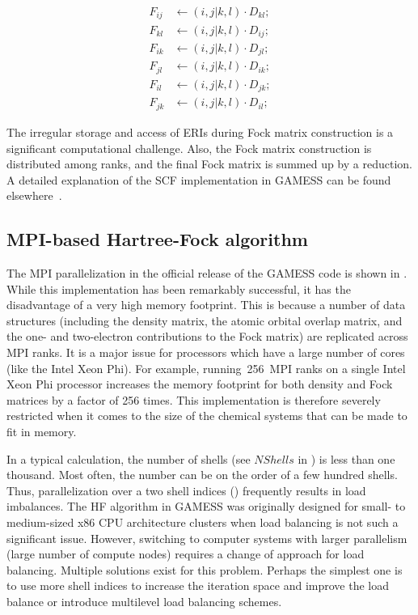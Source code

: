\begin{subequations}
	\label{eqn:fockupd}
	\begin{align}
		F_{ij} &\gets (i,j|k,l)\cdot D_{kl}; \label{eqn:fockupd:a} \\
		F_{kl} &\gets (i,j|k,l)\cdot D_{ij}; \label{eqn:fockupd:b}\\
		F_{ik} &\gets (i,j|k,l)\cdot D_{jl}; \label{eqn:fockupd:c}\\
		F_{jl} &\gets (i,j|k,l)\cdot D_{ik}; \label{eqn:fockupd:d}\\
		F_{il} &\gets (i,j|k,l)\cdot D_{jk}; \label{eqn:fockupd:e}\\
		F_{jk} &\gets (i,j|k,l)\cdot D_{il}; \label{eqn:fockupd:f}
	\end{align}
\end{subequations}

The irregular storage and access of ERIs during Fock matrix construction is a significant computational challenge. Also, the Fock matrix construction is distributed among ranks, and the final Fock matrix is summed up by a reduction. A detailed explanation of the SCF implementation in GAMESS can be found elsewhere~\cite{schmidt1993general}.

\subsection{MPI-based Hartree-Fock algorithm}
\label{ssec:mpi}
The MPI parallelization in the official release of the GAMESS code is shown in . While this implementation has been remarkably successful, it has the disadvantage of a very high memory footprint. This is because a number of data structures (including the density matrix, the atomic orbital overlap matrix, and the one- and two-electron contributions to the Fock matrix) are replicated across MPI ranks. It is a major issue for processors which have a large number of cores (like the Intel Xeon Phi). For example, running~256~MPI ranks on a single Intel Xeon Phi processor increases the memory footprint for both density and Fock matrices by a factor of 256 times. This implementation is therefore severely restricted when it comes to the size of the chemical systems that can be made to fit in memory. 

In a typical calculation, the number of shells (see $NShells$ in ) is less than one thousand. Most often, the number can be on the order of a few hundred shells. Thus, parallelization over a two shell indices () frequently results in  load imbalances. The HF algorithm in GAMESS was originally designed for small- to medium-sized x86 CPU architecture clusters when load balancing is not such a significant issue. However, switching to computer systems with larger parallelism (large number of compute nodes) requires a change of approach for load balancing. Multiple solutions exist for this problem. Perhaps the simplest one is to use more shell indices to increase the iteration space and improve the load balance or introduce multilevel load balancing schemes.

